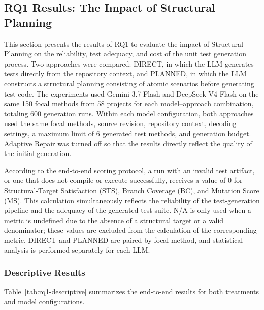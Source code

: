 \documentclass[pdflatex,sn-basic,Numbered,iicol]{sn-jnl}
\begin{document}
\subsection{RQ1 Results: The Impact of Structural Planning}\label{subsec:rq1}

This section presents the results of RQ1 to evaluate the impact of Structural Planning on the reliability, test adequacy, and cost of the unit test generation process. Two approaches were compared: DIRECT, in which the LLM generates tests directly from the repository context, and PLANNED, in which the LLM constructs a structural planning consisting of atomic scenarios before generating test code. The experiments used Gemini 3.7 Flash and DeepSeek V4 Flash on the same 150 focal methods from 58 projects for each model--approach combination, totaling 600 generation runs. Within each model configuration, both approaches used the same focal methods, source revision, repository context, decoding settings, a maximum limit of 6 generated test methods, and generation budget. Adaptive Repair was turned off so that the results directly reflect the quality of the initial generation.

According to the end-to-end scoring protocol, a run with an invalid test artifact, or one that does not compile or execute successfully, receives a value of 0 for Structural-Target Satisfaction (STS), Branch Coverage (BC), and Mutation Score (MS). This calculation simultaneously reflects the reliability of the test-generation pipeline and the adequacy of the generated test suite. N/A is only used when a metric is undefined due to the absence of a structural target or a valid denominator; these values are excluded from the calculation of the corresponding metric. DIRECT and PLANNED are paired by focal method, and statistical analysis is performed separately for each LLM.

\subsubsection{Descriptive Results}\label{subsubsec:rq1-descriptive}

Table~\ref{tab:rq1-descriptive} summarizes the end-to-end results for both treatments and model configurations.
\end{document}
